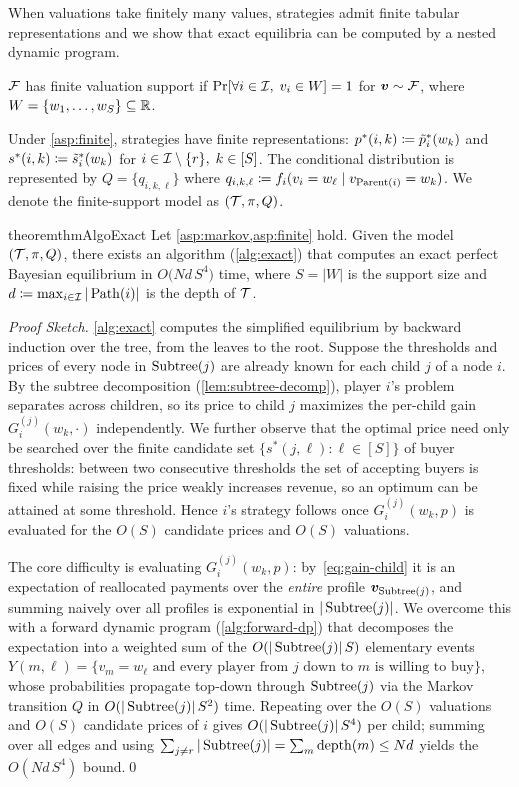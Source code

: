 When valuations take finitely many values, strategies admit finite tabular representations and we show that exact equilibria can be computed by a nested dynamic program.

\begin{assumption}
\label{asp:finite}
$\mathcal{F}$ has finite valuation support if $\Pr[\forall i \in \mathcal{I},\; v_i \in W] = 1$ for ${\bm{v}} \sim \mathcal{F}$, where $W = \{w_1, \ldots, w_S\} \subseteq \mathbb{R}$.
\end{assumption}

Under \cref{asp:finite}, strategies have finite representations: $p^*(i,k) \coloneqq \tilde{p}^*_i(w_k)$ and $s^*(i,k) \coloneqq \tilde{s}^*_i(w_k)$ for $i \in \mathcal{I} \setminus \{r\},\; k \in [S]$. The conditional distribution is represented by $Q = \{q_{i,k,\ell}\}$ where $q_{i,k,\ell} \coloneqq f_i(v_i = w_\ell \mid v_{\operatorname{Parent}(i)} = w_k)$. We denote the finite-support model as $(\mathcal{T}, \pi, Q)$.

\begin{restatable}{theorem}{thmAlgoExact}
\label{thm:algo-exact}
Let \cref{asp:markov,asp:finite} hold. Given the model $(\mathcal{T}, \pi, Q)$, there exists an algorithm (\cref{alg:exact}) that computes an exact perfect Bayesian equilibrium in $O\big(N d\, S^4\big)$ time, where $S = |W|$ is the support size and $d \coloneqq \max_{i \in \mathcal{I}} |\operatorname{Path}(i)|$ is the depth of $\mathcal{T}$.
\end{restatable}

\noindent\emph{Proof Sketch.}
\cref{alg:exact} computes the simplified equilibrium by backward induction over the tree, from the leaves to the root. Suppose the thresholds and prices of every node in $\operatorname{Subtree}(j)$ are already known for each child $j$ of a node $i$. By the subtree decomposition (\cref{lem:subtree-decomp}), player $i$'s problem separates across children, so its price to child $j$ maximizes the per-child gain $G^{(j)}_i(w_k,\cdot)$ independently. We further observe that the optimal price need only be searched over the finite candidate set $\{s^*(j,\ell):\ell\in[S]\}$ of buyer thresholds: between two consecutive thresholds the set of accepting buyers is fixed while raising the price weakly increases revenue, so an optimum can be attained at some threshold. Hence $i$'s strategy follows once $G^{(j)}_i(w_k,p)$ is evaluated for the $O(S)$ candidate prices and $O(S)$ valuations.

The core difficulty is evaluating $G^{(j)}_i(w_k,p)$: by~\eqref{eq:gain-child} it is an expectation of reallocated payments over the \emph{entire} profile ${\bm{v}}_{\operatorname{Subtree}(j)}$, and summing naively over all profiles is exponential in $|\operatorname{Subtree}(j)|$. We overcome this with a forward dynamic program (\cref{alg:forward-dp}) that decomposes the expectation into a weighted sum of the $O(|\operatorname{Subtree}(j)|\,S)$ elementary events $Y(m,\ell) = \{v_m = w_\ell \text{ and every player from } j \text{ down to } m \text{ is willing to buy}\}$, whose probabilities propagate top-down through $\operatorname{Subtree}(j)$ via the Markov transition $Q$ in $O(|\operatorname{Subtree}(j)|\,S^2)$ time. Repeating over the $O(S)$ valuations and $O(S)$ candidate prices of $i$ gives $O(|\operatorname{Subtree}(j)|\,S^4)$ per child; summing over all edges and using $\sum_{j\neq r}|\operatorname{Subtree}(j)| = \sum_m \mathrm{depth}(m) \le Nd$ yields the $O(Nd\,S^4)$ bound.\qed

